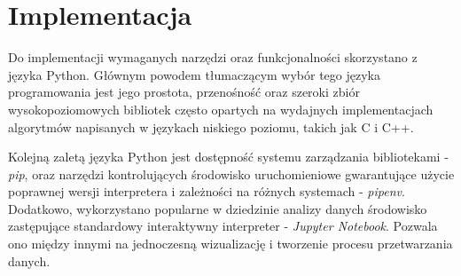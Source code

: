 \chapter{Implementacja}\label{chap:impl}
{
    Do implementacji wymaganych narzędzi oraz funkcjonalności skorzystano z języka Python. Głównym powodem tłumaczącym wybór tego języka programowania jest jego prostota, przenośność oraz szeroki zbiór wysokopoziomowych bibliotek często opartych na wydajnych implementacjach algorytmów napisanych w językach niskiego poziomu, takich jak C i C++. 

    Kolejną zaletą języka Python jest dostępność systemu zarządzania bibliotekami - {\textit {pip}}, oraz narzędzi kontrolujących środowisko uruchomieniowe gwarantujące użycie poprawnej wersji interpretera i zależności na różnych systemach - {\textit {pipenv}}. Dodatkowo, wykorzystano popularne w dziedzinie analizy danych środowisko zastępujące standardowy interaktywny interpreter - {\textit {Jupyter Notebook}}. Pozwala ono między innymi na jednoczesną wizualizację i tworzenie procesu przetwarzania danych. 

}

